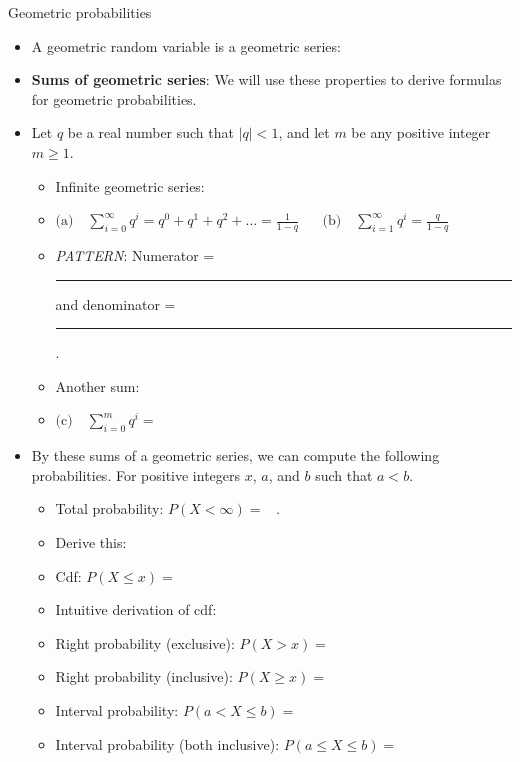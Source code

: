 \documentclass{article}
\newcommand{\blankul}[1]{\rule[-1.5mm]{#1}{0.15mm}}	%
\begin{document}
Geometric probabilities\bigskip
\begin{itemize}
    \item A geometric random variable is a geometric series:\vspace{30pt}
    \item \textbf{Sums of geometric series}: We will use these properties to derive formulas for geometric probabilities.
    \item[] Let $q$ be a real number such that $\lvert q \rvert < 1$, and let $m$ be any positive integer $m \ge 1$. 
    \begin{itemize}
        \item Infinite geometric series:
        \item[] $\displaystyle\text{(a)}\quad \sum_{i = 0}^{\infty} q^i= q^0 + q^1 + q^2 + \dots = \frac{1}{1 - q} \hspace{20pt} \text{(b)}\quad \sum_{i = 1}^{\infty} q^i = \frac{q}{1 - q}$\bigskip        \item[] \textit{PATTERN}: Numerator = \blankul{4cm} and denominator = \blankul{4cm}.\bigskip
        \item Another sum:
        \item[]$\displaystyle \text{(c)} \quad \sum_{i = 0}^{m} q^i = $\vspace{50pt}
    \end{itemize}
    \item By these sums of a geometric series, we can compute the following probabilities. For positive integers $x$, $a$, and $b$ such that $a < b$.
    \begin{itemize}
        \item Total probability: $P(X < \infty) = \hspace{10pt}$.
        \item[] Derive this:\vspace{150pt}
        \item Cdf: $P(X \le x) = $\vspace{150pt}
        \item[] Intuitive derivation of cdf:\vspace{100pt}
        \item Right probability (exclusive): $P(X > x) = $\vspace{70pt}
        \item Right probability (inclusive): $P(X \ge x) = $\vspace{70pt}
        \item Interval probability: $P(a < X \le b) = $\vspace{70pt}
        \item Interval probability (both inclusive): $P(a \le X \le b) = $\vspace{40pt}
    \end{itemize}
   

\end{itemize}
\end{document}
